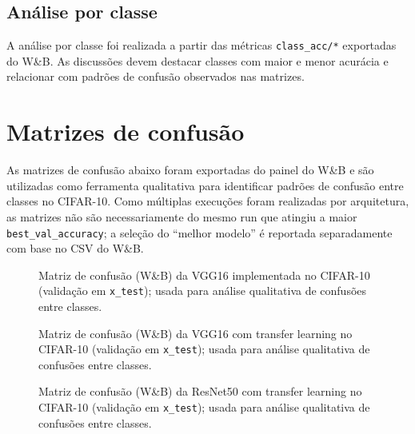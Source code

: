 \documentclass[12pt,a4paper]{article}
\begin{document}
\subsection{Análise por classe}
A análise por classe foi realizada a partir das métricas \texttt{class\_acc/*} exportadas do W\&B.
As discussões devem destacar classes com maior e menor acurácia e relacionar com padrões de confusão observados nas matrizes.

\section{Matrizes de confusão}

As matrizes de confusão abaixo foram exportadas do painel do W\&B e são utilizadas como ferramenta qualitativa para identificar padrões de confusão entre classes no CIFAR-10.
Como múltiplas execuções foram realizadas por arquitetura, as matrizes não são necessariamente do mesmo run que atingiu a maior \texttt{best\_val\_accuracy}; a seleção do ``melhor modelo'' é reportada separadamente com base no CSV do W\&B.


\begin{figure}[H]
\centering
{}
\caption{Matriz de confusão (W\&B) da VGG16 implementada no CIFAR-10 (validação em \texttt{x\_test}); usada para análise qualitativa de confusões entre classes.}
\label{fig:confusao_vgg16}
\end{figure}

\begin{figure}[H]
\centering
{}
\caption{Matriz de confusão (W\&B) da VGG16 com transfer learning no CIFAR-10 (validação em \texttt{x\_test}); usada para análise qualitativa de confusões entre classes.}
\label{fig:confusao_vgg16_tl}
\end{figure}

\begin{figure}[H]
\centering
{}
\caption{Matriz de confusão (W\&B) da ResNet50 com transfer learning no CIFAR-10 (validação em \texttt{x\_test}); usada para análise qualitativa de confusões entre classes.}
\label{fig:confusao_resnet50_tl}
\end{figure}
\end{document}
